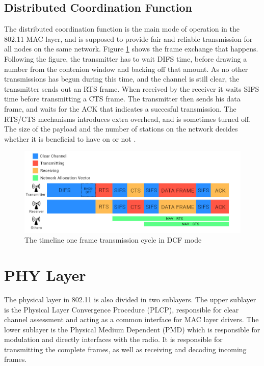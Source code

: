 	\subsection{Distributed Coordination Function}
	The distributed coordination function is the main mode of operation in the 802.11 MAC layer, and is supposed to provide fair and reliable 
	transmission for all nodes on the same network. Figure \ref{fig:dcfmode} shows the 
	frame exchange that happens. Following the figure, the transmitter has to wait DIFS time, before drawing 
	a number from the contenion window and backing off that amount.
	As no other transmissions has begun during this time, and the channel is
	still clear, the transmitter sends out an RTS frame. When received by the receiver
	it waits SIFS time before transmitting a CTS frame. The transmitter then sends his
	data frame, and waits for the ACK that indicates a succesful transmission. The 
	RTS/CTS mechanisms introduces extra overhead, and is sometimes turned off. The
	size of the payload and the number of stations on the network decides
	whether it is beneficial to have on or not \cite{DCFanalysis}.



	\begin{figure}
	\center
	\includegraphics[scale=0.35]{Images/DCF.jpg}
	\caption{The timeline one frame transmission cycle in DCF mode}
	\label{fig:dcfmode}
	\end{figure}



	\section{PHY Layer}
	The physical layer in 802.11 is also divided in two sublayers. The upper sublayer is the Physical Layer Convergence Procedure (PLCP), responsible for clear channel assessment and acting
	as a common interface for MAC layer drivers. The lower sublayer is the Physical Medium Dependent (PMD) which is responsible for modulation and directly interfaces with
	the radio. It is responsible for transmitting the complete frames, as well as receiving and decoding incoming frames. 

